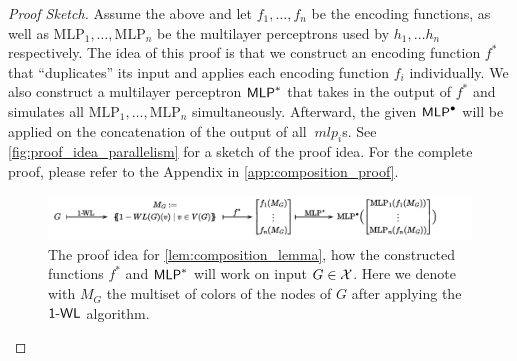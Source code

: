 \begin{proof}[Proof Sketch]
    Assume the above and let $f_{1}, \ldots, f_{n}$ be the encoding functions, as well as $\text{MLP}_1, \ldots, \text{MLP}_n$ be the multilayer perceptrons used by $h_1, \dots h_n$ respectively. The idea of this proof is that we construct an encoding function $f^*$ that ``duplicates'' its input and applies each encoding function $f_i$ individually. We also construct a multilayer perceptron $\textsf{MLP}^*$ that takes in the output of $f^*$ and simulates all $\text{MLP}_1, \ldots, \text{MLP}_n$ simultaneously. Afterward, the given $\textsf{MLP}^\bullet$ will be applied on the concatenation of the output of all $\ mlp_i$s. See \autoref{fig:proof_idea_parallelism} for a sketch of the proof idea. For the complete proof, please refer to the Appendix in \autoref{app:composition_proof}.

    \begin{figure}[H]
        \centering
        \includegraphics[width=\textwidth]{Figures/proof_sketch_wlnn_composition.pdf}
        \caption{The proof idea for \autoref{lem:composition_lemma}, how the constructed functions $f^*$ and $\textsf{MLP}^*$ will work on input $G \in \mathcal{X}$. Here we denote with $M_G$ the multiset of colors of the nodes of $G$ after applying the $\textsf{1-WL}$ algorithm.}
        \label{fig:proof_idea_parallelism}
    \end{figure}
\end{proof}
    



